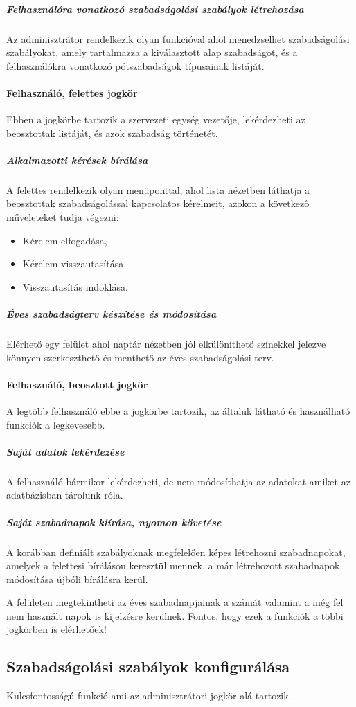 \subparagraph{Felhasználóra vonatkozó szabadságolási szabályok létrehozása}
Az adminisztrátor rendelkezik olyan funkcióval ahol menedzselhet szabadságolási szabályokat, amely tartalmazza a kiválasztott alap szabadságot, és a felhasználókra vonatkozó pótszabadságok típusainak listáját.

\paragraph{Felhasználó, felettes jogkör}
Ebben a jogkörbe tartozik a szervezeti egység vezetője, lekérdezheti az beosztottak listáját, és azok szabadság történetét.

\subparagraph{Alkalmazotti kérések bírálása}
A felettes rendelkezik olyan menüponttal, ahol lista nézetben láthatja a beosztottak szabadságolással kapcsolatos kérelmeit, azokon a következő műveleteket tudja végezni:
\begin{itemize}
	\item Kérelem elfogadása,
	\item Kérelem visszautasítása,
	\item Visszautasítás indoklása.
\end{itemize}

\subparagraph{Éves szabadságterv készítése és módosítása}
Elérhető egy felület ahol naptár nézetben jól elkülöníthető színekkel jelezve könnyen szerkeszthető és menthető az éves szabadságolási terv.

\paragraph{Felhasználó, beosztott jogkör}
A legtöbb felhasználó ebbe a jogkörbe tartozik, az általuk látható és használható funkciók a legkevesebb.

\subparagraph{Saját adatok lekérdezése}
A felhasználó bármikor lekérdezheti, de nem módosíthatja az adatokat amiket az adatbázisban tárolunk róla.

\subparagraph{Saját szabadnapok kiírása, nyomon követése}
A korábban definiált szabályoknak megfelelően képes létrehozni szabadnapokat, amelyek a felettesi bíráláson keresztül mennek, a már létrehozott szabadnapok módosítása újbóli bírálásra kerül. 

A felületen megtekintheti az éves szabadnapjainak a számát valamint a még fel nem használt napok is kijelzésre kerülnek.
\vskip 0.2in
Fontos, hogy ezek a funkciók a többi jogkörben is elérhetőek! 

\subsection{Szabadságolási szabályok konfigurálása}
Kulcsfontosságú funkció ami az adminisztrátori jogkör alá tartozik.

